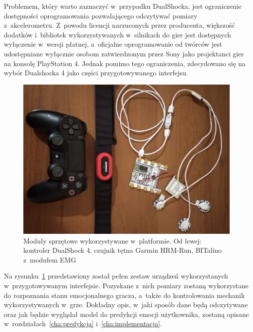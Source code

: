 Problemem, który warto zaznaczyć w~przypadku DualShocka, jest ograniczenie dostępności oprogramowania pozwalającego odczytywać pomiary z~akcelerometru. Z~powodu licencji narzuconych przez producenta, większość dodatków i~bibliotek wykorzystywanych w~silnikach do gier jest dostępnych wyłączenie w~wersji płatnej, a~oficjalne oprogramowanie od twórców jest udostępniane wyłącznie osobom zatwierdzonym przez Sony jako projektanci gier na konsolę PlayStation 4. Jednak pomimo tego ograniczenia, zdecydowano się na wybór Dualshocka 4 jako części przygotowywanego interfejsu.

\begin{figure}
	\centering
	\includegraphics[width=0.7\linewidth]{images/hardware.jpg}
	\caption{Moduły sprzętowe wykorzystywane w~platformie. Od lewej: kontroler DualShock 4, czujnik tętna Garmin HRM-Run, BITalino z~modułem EMG}
	\label{fig:hardware}
\end{figure}

Na rysunku~\ref{fig:hardware} przedstawiony został pełen zestaw urządzeń wykorzystanych w~przygotowywanym interfejsie. Pozyskane z~nich pomiary zostaną wykorzystane do rozpoznania stanu emocjonalnego gracza, a~także do kontrolowania mechanik wykorzystywanych w~grze. Dokładny opis, w~jaki sposób dane będą odczytywane oraz jak będzie wyglądał model do predykcji emocji użytkownika, zostaną opisane w~rozdziałach~\ref{cha:predykcja} i~\ref{cha:implementacja}.
